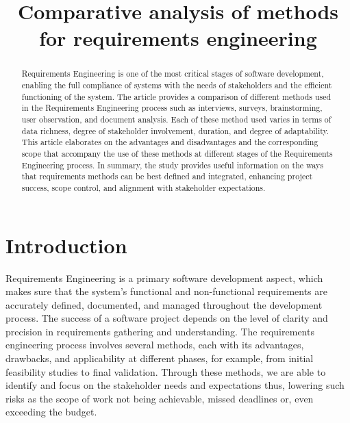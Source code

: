 \documentclass[conference]{IEEEtran}
\begin{document}
\title{Comparative analysis of methods for requirements engineering}

\author{
}

\maketitle

\begin{abstract}
Requirements Engineering is one of the most critical stages of software development, enabling the full compliance of systems with the needs of stakeholders and the efficient functioning of the system. The article provides a comparison of different methods used in the Requirements Engineering process such as interviews, surveys, brainstorming, user observation, and document analysis. Each of these method used varies in terms of data richness, degree of stakeholder involvement, duration, and degree of adaptability. This article elaborates on the advantages and disadvantages and the corresponding scope that accompany the use of these methods at different stages of the Requirements Engineering process. In summary, the study provides useful information on the ways that requirements methods can be best defined and integrated, enhancing project success, scope control, and alignment with stakeholder expectations.
\end{abstract}

\section{Introduction}

Requirements Engineering is a primary software development aspect, which makes sure that the system's functional and non-functional requirements are accurately defined, documented, and managed throughout the development process. The success of a software project depends on the level of clarity and precision in requirements gathering and understanding. The requirements engineering process involves several methods, each with its advantages, drawbacks, and applicability at different phases, for example, from initial feasibility studies to final validation. Through these methods, we are able to identify and focus on the stakeholder needs and expectations thus, lowering such risks as the scope of work not being achievable, missed deadlines or, even exceeding the budget.
\end{document}
